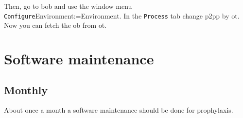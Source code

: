 \documentclass[11pt,fleqn,a4paper]{book}
\makeatletter
\def\menu#1#2{\texttt{#1}\ifx{}#2\else\@for\@x:=#2\do{$\rightarrow$\texttt{\@x}}\fi}
\def\wmenu#1#2{window menu \menu{#1}{#2}}
\makeatother
\begin{document}
Then, go to \gls{bob} and use the \wmenu{Configure}{Environment}. In the \texttt{Process} tab change \gls{p2pp} by \gls{ot}. Now you can fetch the \gls{ob} from \gls{ot}.




\chapter{Software maintenance}
\label{chap:reboots}

\section{Monthly}

About once a month a software maintenance should be done for prophylaxis.
\end{document}
